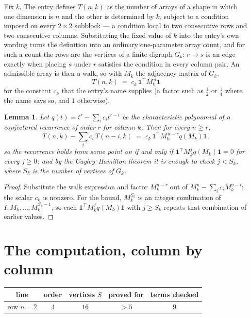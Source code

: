 \documentclass[11pt,a4paper]{article}
\theoremstyle{plain}
\newtheorem{lemma}[theorem]{Lemma}
\theoremstyle{definition}
\begin{document}
Fix $k$. The entry defines $T(n,k)$ as the number of arrays of a shape in which one dimension
is $n$ and the other is determined by $k$, subject to a condition imposed on every
$2\times2$ subblock --- a condition local to two consecutive rows and two consecutive columns.
Substituting the fixed value of $k$ into the entry's own wording turns the definition into an
ordinary one-parameter array count, and for such a count the rows are the vertices of a finite
digraph $G_k$: $r\to s$ is an edge exactly when placing $s$ under $r$ satisfies the condition
in every column pair. An admissible array is then a walk, so with $M_k$ the adjacency matrix
of $G_k$,
\[
T(n,k)\;=\;c_k\,\mathbf{1}^{\!\top}M_k^{\,n}\mathbf{1}
\]
for the constant $c_k$ that the entry's name supplies (a factor such as $\tfrac12$ or
$\tfrac14$ where the name says so, and $1$ otherwise).

\begin{lemma}\label{lem:crit}
Let $q(t)=t^{r}-\sum_i c_it^{r-i}$ be the characteristic polynomial of a conjectured
recurrence of order $r$ for column $k$. Then for every $n\ge r$,
\[
T(n,k)-\sum_i c_i\,T(n-i,k)\;=\;c_k\,\mathbf{1}^{\!\top}M_k^{\,n-r}q(M_k)\mathbf{1},
\]
so the recurrence holds from some point on if and only if
$\mathbf{1}^{\!\top}M_k^{j}q(M_k)\mathbf{1}=0$ for every $j\ge0$; and by the
Cayley--Hamilton theorem it is enough to check $j<S_k$, where $S_k$ is the number of vertices
of $G_k$.
\end{lemma}

\begin{proof}
Substitute the walk expression and factor $M_k^{n-r}$ out of $M_k^{n}-\sum_ic_iM_k^{n-i}$;
the scalar $c_k$ is nonzero. For the bound, $M_k^{S_k}$ is an integer combination of
$I,M_k,\dots,M_k^{S_k-1}$, so each $\mathbf{1}^{\!\top}M_k^{j}q(M_k)\mathbf{1}$ with
$j\ge S_k$ repeats that combination of earlier values.
\end{proof}

\section{The computation, column by column}

\begin{center}
\begin{tabular}{ccccc}
line & order & vertices $S$ & proved for & terms checked \\ \hline
row $n$$=2$ & $4$ & $16$ & $>5$ & $9$ \\
\end{tabular}
\end{center}
\end{document}
